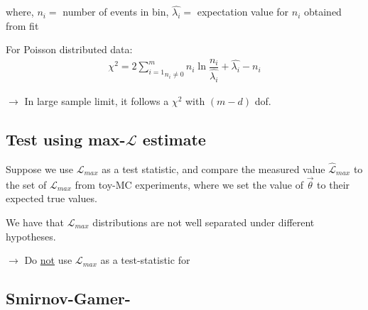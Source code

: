 where, $n_i=$ number of events in bin, $\hat{\lambda_i}=$ expectation value for $n_i$ obtained from fit

For Poisson distributed data: 
\begin{align}
  \chi^2 = 2 \underset{n_i \neq 0}{\sum \limits_{i=1}^m} n_i \ln \dfrac{n_i}{\hat{\lambda_i}} + \hat{\lambda_i} - n_i 
\end{align}

$\to$ In large sample limit, it follows a $\chi^2$ with $(m-d)$ dof. 

\subsection{Test using max-$\mathcal{L}$ estimate}
Suppose we use $\mathcal{L}_{max}$ as a test statistic, and compare the measured value $\hat{\mathcal{L}}_{max}$ to the set of $\mathcal{L}_{max}$ from toy-MC experiments, where we set the value of $\vec{\theta}$ to their expected true values. 

We have that $\mathcal{L}_{max}$ distributions are not well separated under different hypotheses. 

$\to$ Do \underline{not} use $\mathcal{L}_{max}$ as a test-statistic for  

\subsection{Smirnov-Gamer-}
